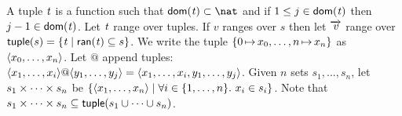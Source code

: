 \documentclass[final]{article}
\begin{document}
%
%
%
%
A tuple $\mathit{t}$ is a function such that $\MEMdom{\METAtup} \subset
\SETnat$ and if $1 \leq j \in \mathsf{dom}(\mathit{t})$ then $j - 1
\in \mathsf{dom}(\mathit{t})$.
%
Let $\mathit{t}$ range over tuples.
%
If $v$ ranges over $s$ then let $\overrightarrow{\mathit{v}}$ range
over $\mathsf{tuple}(s)=\{\mathit{t}\mid\mathsf{ran}(\mathit{t})\subseteq{s}\}$.
%
We write the tuple
$\{0\,{\mapsto}\,x_0,\dots,n\,{\mapsto}\,x_n\}$ as
$\langle x_0,\dots,x_n \rangle$.
Let $@$ append tuples:
$\mytuple{x_1,\dots,x_i}@\mytuple{y_1,\dots,y_j}
=\mytuple{x_1,\dots,x_i,y_1,\dots,y_j}$.
%
Given $n$ sets $s_1,\dots,s_n$, let $s_1\mathbin\times\cdots\mathbin\times{s_n}$ be
$\{\langle x_1,\dots,x_n \rangle\mid\forall i\in\{1,\dots,n\}.\ x_i\in{s_i}\}$.
Note that
$s_1\mathbin\times\cdots\mathbin\times{s_n}\subseteq\mathsf{tuple}(s_1\cup\cdots\cup{s_n})$.
%
%
%
%
\end{document}
